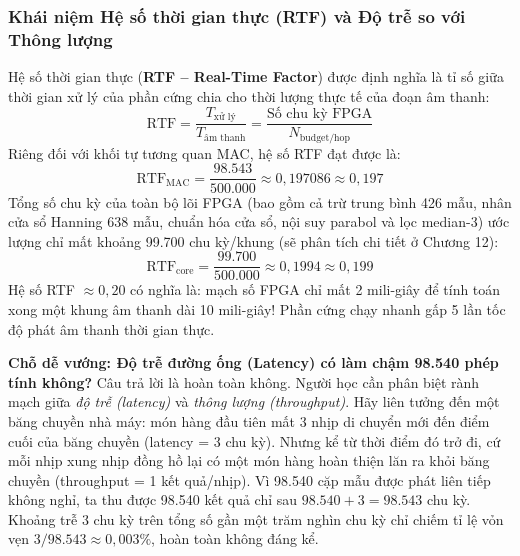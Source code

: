 \subsubsection*{Khái niệm Hệ số thời gian thực (RTF) và Độ trễ so với Thông lượng}
Hệ số thời gian thực (\textbf{RTF -- Real-Time Factor}) được định nghĩa là tỉ số giữa thời gian xử lý của phần cứng chia cho thời lượng thực tế của đoạn âm thanh:
\begin{equation}
\text{RTF} = \frac{T_{\text{xử lý}}}{T_{\text{âm thanh}}} = \frac{\text{Số chu kỳ FPGA}}{N_{\text{budget/hop}}}
\end{equation}
Riêng đối với khối tự tương quan MAC, hệ số RTF đạt được là:
\begin{equation}
\text{RTF}_{\text{MAC}} = \frac{98.543}{500.000} \approx 0{,}197086 \approx 0{,}197
\end{equation}
Tổng số chu kỳ của toàn bộ lõi FPGA (bao gồm cả trừ trung bình 426 mẫu, nhân cửa sổ Hanning 638 mẫu, chuẩn hóa cửa sổ, nội suy parabol và lọc median-3) ước lượng chỉ mất khoảng 99.700 chu kỳ/khung (sẽ phân tích chi tiết ở Chương 12):
\begin{equation}
\text{RTF}_{\text{core}} = \frac{99.700}{500.000} \approx 0{,}1994 \approx 0{,}199
\end{equation}
Hệ số RTF $\approx 0{,}20$ có nghĩa là: mạch số FPGA chỉ mất 2 mili-giây để tính toán xong một khung âm thanh dài 10 mili-giây! Phần cứng chạy nhanh gấp 5 lần tốc độ phát âm thanh thời gian thực.

\textbf{Chỗ dễ vướng: Độ trễ đường ống (Latency) có làm chậm 98.540 phép tính không?}
Câu trả lời là hoàn toàn không. Người học cần phân biệt rành mạch giữa \emph{độ trễ (latency)} và \emph{thông lượng (throughput)}. Hãy liên tưởng đến một băng chuyền nhà máy: món hàng đầu tiên mất 3 nhịp di chuyển mới đến điểm cuối của băng chuyền (latency = 3 chu kỳ). Nhưng kể từ thời điểm đó trở đi, cứ mỗi nhịp xung nhịp đồng hồ lại có một món hàng hoàn thiện lăn ra khỏi băng chuyền (throughput = 1 kết quả/nhịp). Vì 98.540 cặp mẫu được phát liên tiếp không nghỉ, ta thu được 98.540 kết quả chỉ sau $98.540 + 3 = 98.543$ chu kỳ. Khoảng trễ 3 chu kỳ trên tổng số gần một trăm nghìn chu kỳ chỉ chiếm tỉ lệ vỏn vẹn $3 / 98.543 \approx 0{,}003\%$, hoàn toàn không đáng kể.

